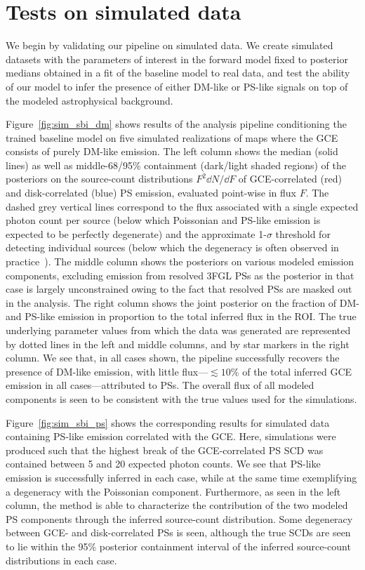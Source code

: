 \documentclass[prd,aps,10pt,nofootinbib,twocolumn,superscriptaddress,preprintnumbers,balancelastpage,longbibliography]{revtex4-1}
\begin{document}
\section{Tests on simulated data}
\label{sec:simulations}

We begin by validating our pipeline on simulated \Fermi data. We create simulated datasets with the parameters of interest in the forward model fixed to posterior medians obtained in a fit of the baseline model to real \Fermi data, and test the ability of our model to infer the presence of either DM-like or PS-like signals on top of the modeled astrophysical background.

Figure~\ref{fig:sim_sbi_dm} shows results of the analysis pipeline conditioning the trained baseline model on five simulated realizations of maps where the GCE consists of purely DM-like emission. The left column shows the median (solid lines) as well as middle-68/95\% containment (dark/light shaded regions) of the posteriors on the source-count distributions $F^2 \dd N/\dd F$ of GCE-correlated (red) and disk-correlated (blue) PS emission, evaluated point-wise in flux $F$. The dashed grey vertical lines correspond to the flux associated with a single expected photon count per source (below which Poissonian and PS-like emission is expected to be perfectly degenerate) and the approximate 1-$\sigma$ threshold for detecting individual sources (below which the degeneracy is often observed in practice~\cite{Chang:2019ars,Buschmann:2020adf}). The middle column shows the posteriors on various modeled emission components, excluding emission from resolved 3FGL PSs as the posterior in that case is largely unconstrained owing to the fact that resolved PSs are masked out in the analysis. The right column shows the joint posterior on the fraction of DM- and PS-like emission in proportion to the total inferred flux in the ROI. The true underlying parameter values from which the data was generated are represented by dotted lines in the left and middle columns, and by star markers in the right column. We see that, in all cases shown, the pipeline successfully recovers the presence of DM-like emission, with little flux---$\lesssim 10\%$ of the total inferred GCE emission in all cases---attributed to PSs. 
The overall flux of all modeled components is seen to be consistent with the true values used for the simulations.

Figure~\ref{fig:sim_sbi_ps} shows the corresponding results for simulated data containing PS-like emission correlated with the GCE. Here, simulations were produced such that the highest break of the GCE-correlated PS SCD was contained between 5 and 20 expected photon counts. We see that PS-like emission is successfully inferred in each case, while at the same time exemplifying a degeneracy with the Poissonian component. Furthermore, as seen in the left column, the method is able to characterize the contribution of the two modeled PS components through the inferred source-count distribution. Some degeneracy between GCE- and disk-correlated PSs is seen, although the true SCDs are seen to lie within the 95\% posterior containment interval of the inferred source-count distributions in each case.
\end{document}

